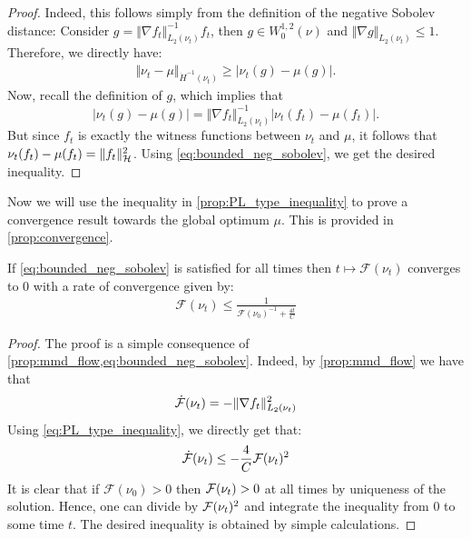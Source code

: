 \begin{proof}
	Indeed, this follows simply from the definition of the negative Sobolev distance: Consider $g = \Vert \nabla f_t\Vert^{-1}_{L_2(\nu_t)} f_t$, then $g\in W_0^{1,2}(\nu)$  and $\Vert \nabla g \Vert_{L_2(\nu_t)}\leq 1$. Therefore, we directly have:
	\begin{align}
		\Vert \nu_t - \mu\Vert_{\dot{H}^{-1}(\nu_t)}\geq \vert \nu_t(g) - \mu(g)  \vert.
	\end{align}
Now, recall the definition of $g$, which implies that
\[
\vert \nu_t(g) - \mu(g)  \vert = \Vert \nabla f_t\Vert^{-1}_{L_2(\nu_t)} \vert \nu_t(f_t)-\mu(f_t)\vert.
\]
But since $f_t$  is exactly the witness functions between $\nu_t$ and $\mu$, it follows that $\nu_t(f_t)-\mu(f_t) = \Vert f_t\Vert^2_{{{\mathcal H}}}$.
Using \cref{eq:bounded_neg_sobolev}, we get the desired inequality.
\end{proof}

Now we will use the inequality in \cref{prop:PL_type_inequality} to prove a convergence result towards the global optimum $\mu$. This is provided in \cref{prop:convergence}.

\begin{proposition}\label{prop:convergence}
	If \cref{eq:bounded_neg_sobolev} is satisfied for all times then $t\mapsto \mathcal{F}(\nu_t)$ converges to $0$ with a rate of convergence given by:
	\begin{align}
		\mathcal{F}(\nu_t)\leq \frac{1}{\mathcal{F}(\nu_0)^{-1} + \frac{4t}{C}}
	\end{align}
\end{proposition}
\begin{proof}
	The proof is a simple consequence of \cref{prop:mmd_flow,eq:bounded_neg_sobolev}. Indeed, by \cref{prop:mmd_flow} we have that 
	\begin{align}
		\dot{{{\mathcal F}}}(\nu_t) = - \Vert \nabla f_t \Vert^2_{L_2(\nu_t)} 	
	\end{align}
	Using \cref{eq:PL_type_inequality}, we directly get that:
	\begin{align}
		\dot{{{\mathcal F}}}(\nu_t) \leq  -\frac{4}{C}{{\mathcal F}}(\nu_t)^2
	\end{align}
It is clear that if $\mathcal{F}(\nu_0)>0$ then ${{\mathcal F}}(\nu_t)>0$ at all times by uniqueness of the solution. Hence, one can divide by ${{\mathcal F}}(\nu_t)^2$ and integrate the inequality from $0$ to some time $t$. The desired inequality is obtained by simple calculations.
\end{proof}

